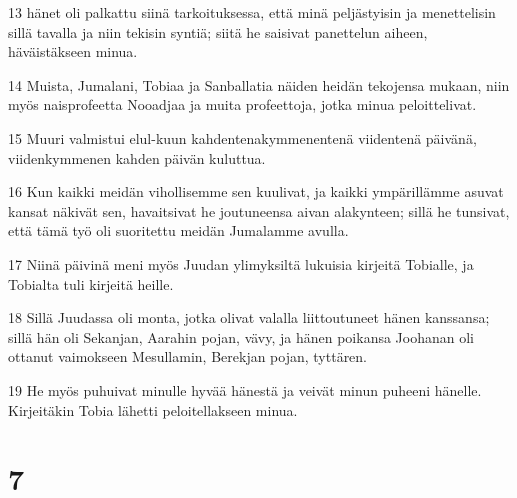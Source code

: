 \par 13 hänet oli palkattu siinä tarkoituksessa, että minä peljästyisin ja menettelisin sillä tavalla ja niin tekisin syntiä; siitä he saisivat panettelun aiheen, häväistäkseen minua.
\par 14 Muista, Jumalani, Tobiaa ja Sanballatia näiden heidän tekojensa mukaan, niin myös naisprofeetta Nooadjaa ja muita profeettoja, jotka minua peloittelivat.
\par 15 Muuri valmistui elul-kuun kahdentenakymmenentenä viidentenä päivänä, viidenkymmenen kahden päivän kuluttua.
\par 16 Kun kaikki meidän vihollisemme sen kuulivat, ja kaikki ympärillämme asuvat kansat näkivät sen, havaitsivat he joutuneensa aivan alakynteen; sillä he tunsivat, että tämä työ oli suoritettu meidän Jumalamme avulla.
\par 17 Niinä päivinä meni myös Juudan ylimyksiltä lukuisia kirjeitä Tobialle, ja Tobialta tuli kirjeitä heille.
\par 18 Sillä Juudassa oli monta, jotka olivat valalla liittoutuneet hänen kanssansa; sillä hän oli Sekanjan, Aarahin pojan, vävy, ja hänen poikansa Joohanan oli ottanut vaimokseen Mesullamin, Berekjan pojan, tyttären.
\par 19 He myös puhuivat minulle hyvää hänestä ja veivät minun puheeni hänelle. Kirjeitäkin Tobia lähetti peloitellakseen minua.

\chapter{7}

